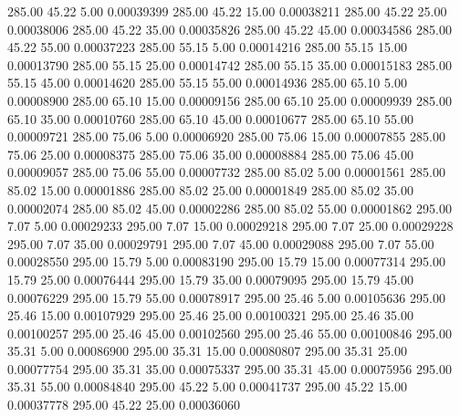     285.00     45.22      5.00     0.00039399
    285.00     45.22     15.00     0.00038211
    285.00     45.22     25.00     0.00038006
    285.00     45.22     35.00     0.00035826
    285.00     45.22     45.00     0.00034586
    285.00     45.22     55.00     0.00037223
    285.00     55.15      5.00     0.00014216
    285.00     55.15     15.00     0.00013790
    285.00     55.15     25.00     0.00014742
    285.00     55.15     35.00     0.00015183
    285.00     55.15     45.00     0.00014620
    285.00     55.15     55.00     0.00014936
    285.00     65.10      5.00     0.00008900
    285.00     65.10     15.00     0.00009156
    285.00     65.10     25.00     0.00009939
    285.00     65.10     35.00     0.00010760
    285.00     65.10     45.00     0.00010677
    285.00     65.10     55.00     0.00009721
    285.00     75.06      5.00     0.00006920
    285.00     75.06     15.00     0.00007855
    285.00     75.06     25.00     0.00008375
    285.00     75.06     35.00     0.00008884
    285.00     75.06     45.00     0.00009057
    285.00     75.06     55.00     0.00007732
    285.00     85.02      5.00     0.00001561
    285.00     85.02     15.00     0.00001886
    285.00     85.02     25.00     0.00001849
    285.00     85.02     35.00     0.00002074
    285.00     85.02     45.00     0.00002286
    285.00     85.02     55.00     0.00001862
    295.00      7.07      5.00     0.00029233
    295.00      7.07     15.00     0.00029218
    295.00      7.07     25.00     0.00029228
    295.00      7.07     35.00     0.00029791
    295.00      7.07     45.00     0.00029088
    295.00      7.07     55.00     0.00028550
    295.00     15.79      5.00     0.00083190
    295.00     15.79     15.00     0.00077314
    295.00     15.79     25.00     0.00076444
    295.00     15.79     35.00     0.00079095
    295.00     15.79     45.00     0.00076229
    295.00     15.79     55.00     0.00078917
    295.00     25.46      5.00     0.00105636
    295.00     25.46     15.00     0.00107929
    295.00     25.46     25.00     0.00100321
    295.00     25.46     35.00     0.00100257
    295.00     25.46     45.00     0.00102560
    295.00     25.46     55.00     0.00100846
    295.00     35.31      5.00     0.00086900
    295.00     35.31     15.00     0.00080807
    295.00     35.31     25.00     0.00077754
    295.00     35.31     35.00     0.00075337
    295.00     35.31     45.00     0.00075956
    295.00     35.31     55.00     0.00084840
    295.00     45.22      5.00     0.00041737
    295.00     45.22     15.00     0.00037778
    295.00     45.22     25.00     0.00036060
